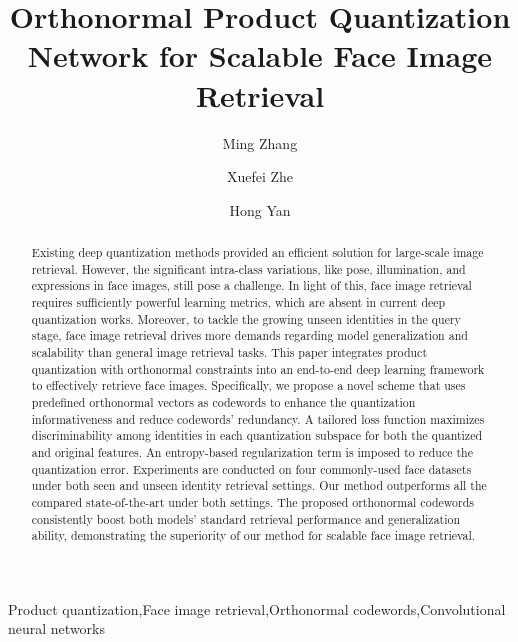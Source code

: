 \documentclass{elsarticle}
\begin{document}
\begin{frontmatter}

\title{Orthonormal Product Quantization Network for Scalable Face Image Retrieval}

\author[1,2,3]{Ming Zhang}

\author[4]{Xuefei Zhe}


\author[1,2]{Hong Yan}

\address[1]{Department of Electrical Engineering, City University of Hong Kong, Hong Kong}
\address[2]{Centre for Intelligent Multidimensional Data Analysis Limited, Hong Kong}
\address[3]{Hong Kong Applied Science and Technology Research Institute Company Limited, Hong Kong}
\address[4]{Tencent AI Lab, Shenzhen, China}

\begin{abstract}
Existing deep quantization methods provided an efficient solution for large-scale image retrieval. However, the significant intra-class variations, like pose, illumination, and expressions in face images, still pose a challenge. In light of this, face image retrieval requires sufficiently powerful learning metrics, which are absent in current deep quantization works. Moreover, to tackle the growing unseen identities in the query stage, face image retrieval drives more demands regarding model generalization and scalability than general image retrieval tasks. This paper integrates product quantization with orthonormal constraints into an end-to-end deep learning framework to effectively retrieve face images. Specifically, we propose a novel scheme that uses predefined orthonormal vectors as codewords to enhance the quantization informativeness and reduce codewords' redundancy. A tailored loss function maximizes discriminability among identities in each quantization subspace for both the quantized and original features. An entropy-based regularization term is imposed to reduce the quantization error. Experiments are conducted on four commonly-used face datasets under both seen and unseen identity retrieval settings. Our method outperforms all the compared state-of-the-art under both settings. The proposed orthonormal codewords consistently boost both models' standard retrieval performance and generalization ability, demonstrating the superiority of our method for scalable face image retrieval.
\end{abstract}

\begin{keyword}
Product quantization\sep  Face image retrieval\sep Orthonormal codewords\sep Convolutional neural networks
\end{keyword}

\end{frontmatter}
\nolinenumbers
\end{document}
